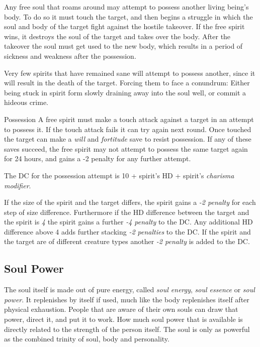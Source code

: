 Any free soul that roams around may attempt to possess another living being's
body. To do so it must touch the target, and then begins a struggle in which
the soul and body of the target fight against the hostile takeover. If the
free spirit wins, it destroys the soul of the target and takes over the body.
After the takeover the soul must get used to the new body, which results in
a period of sickness and weakness after the possession.

Very few spirits that have remained sane will attempt to possess another, since
it will result in the death of the target. Forcing them to face a conundrum:
Either being stuck in spirit form slowly draining away into the soul well,
or commit a hideous crime.


\begin{35e}{Possession}
  A free spirit must make a touch attack against a target in an attempt to
  possess it. If the touch attack fails it can try again next round. Once
  touched the target can make a \emph{will} and \emph{fortitude} save to
  resist possession. If any of these saves succeed, the free spirit may not
  attempt to possess the same target again for 24 hours, and gains a -2
  penalty for any further attempt.

  The DC for the possession attempt is 10 +  spirit's HD +
  spirit's \emph{charisma modifier}.

  If the size of the spirit and the target differs, the spirit gains a
  \emph{-2 penalty} for each step of size difference. Furthermore if the
  HD difference between the target and the spirit is \emph{4} the spirit gains
  a further \emph{-4 penalty} to the DC. Any additional HD difference above
  4 adds further stacking \emph{-2 penalties} to the DC. If the spirit and
  the target are of different creature types another \emph{-2 penalty} is
  added to the DC.
\end{35e}

\subsection{Soul Power}
\label{sec:Soul Power}

The soul itself is made out of pure energy, called \emph{soul energy},
\emph{soul essence} or \emph{soul power}. It replenishes by itself if used,
much like the body replenishes itself after physical exhaustion. People that
are aware of their own souls can draw that power, direct it, and put it to
work. How much soul power that is available is directly related to the
strength of the person itself. The soul is only as powerful as the combined
trinity of soul, body and personality.

